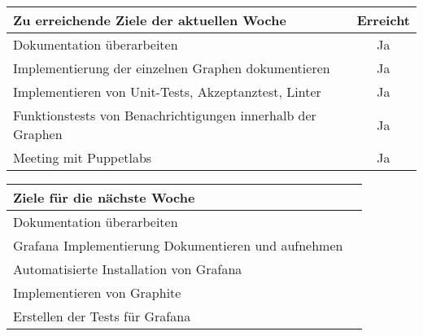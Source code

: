 \begin{tabularx}{\textwidth}{Xc}
    \arrayrulecolor{OliveGreen}
    \toprule
    {\bfseries Zu erreichende Ziele der aktuellen Woche} & {\bfseries Erreicht} \\
    \midrule[2pt]
    Dokumentation überarbeiten                              &Ja              \\
    \rowcolor{OliveGreen!15}
    Implementierung der einzelnen Graphen dokumentieren     &Ja              \\
    \rowcolor{White}
    Implementieren von Unit-Tests, Akzeptanztest, Linter    &Ja              \\
    \rowcolor{OliveGreen!15}
    Funktionstests von Benachrichtigungen innerhalb der Graphen  &Ja         \\
    \rowcolor{White}
    Meeting mit Puppetlabs                                  &Ja              \\
   \bottomrule[2pt]
\end{tabularx}
%
\vspace{1cm}
%
\begin{tabularx}{\textwidth}{Xc}
    \arrayrulecolor{OliveGreen}
    \toprule
    {\bfseries Ziele für die nächste Woche}        &                         \\
    \midrule[2pt]
    Dokumentation überarbeiten                     &                         \\
    \rowcolor{OliveGreen!15}
    Grafana Implementierung Dokumentieren und aufnehmen   &                  \\
    \rowcolor{White}
    Automatisierte Installation von Grafana        &                         \\
    \rowcolor{OliveGreen!15}
    Implementieren von Graphite                   &                          \\
    \rowcolor{White}
    Erstellen der Tests für Grafana               &                          \\
\end{tabularx}
